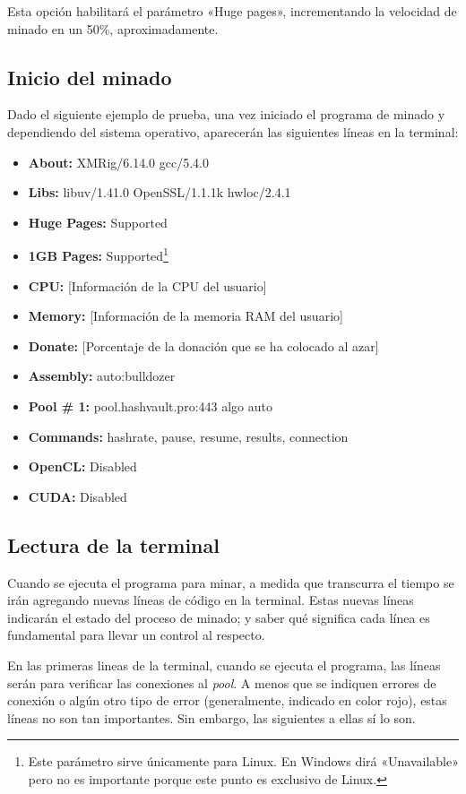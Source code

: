 \documentclass[12pt,a4paper,twoside]{book}
\begin{document}
Esta opción habilitará el parámetro «Huge pages», incrementando la velocidad de minado en un 50\%, aproximadamente.

\subsection{Inicio del minado}
Dado el siguiente ejemplo de prueba, una vez iniciado el programa de minado y dependiendo del sistema operativo, aparecerán las siguientes líneas en la terminal:

\begin{itemize}
\item \textbf{About:} XMRig/6.14.0 gcc/5.4.0
\item \textbf{Libs:} libuv/1.41.0 OpenSSL/1.1.1k hwloc/2.4.1
\item \textbf{Huge Pages:} Supported
\item \textbf{1GB Pages:} Supported\footnote{Este parámetro sirve únicamente para Linux. En Windows dirá «Unavailable» pero no es importante porque este punto es exclusivo de Linux.}
\item \textbf{CPU:} [Información de la CPU del usuario]
\item \textbf{Memory:} [Información de la memoria RAM del usuario]
\item \textbf{Donate:} [Porcentaje de la donación que se ha colocado al azar]
\item \textbf{Assembly:} auto:bulldozer
\item \textbf{Pool \# 1:} pool.hashvault.pro:443 algo auto
\item \textbf{Commands:} hashrate, pause, resume, results, connection
\item \textbf{OpenCL:} Disabled
\item \textbf{CUDA:} Disabled
\end{itemize}

\subsection{Lectura de la terminal}
Cuando se ejecuta el programa para minar, a medida que transcurra el tiempo se irán agregando nuevas líneas de código en la terminal. Estas nuevas líneas indicarán el estado del proceso de minado; y saber qué significa cada línea es fundamental para llevar un control al respecto.

En las primeras lineas de la terminal, cuando se ejecuta el programa, las líneas serán para verificar las conexiones al \textit{pool}. A menos que se indiquen errores de conexión o algún otro tipo de error (generalmente, indicado en color rojo), estas líneas no son tan importantes. Sin embargo, las siguientes a ellas sí lo son. 
\end{document}
